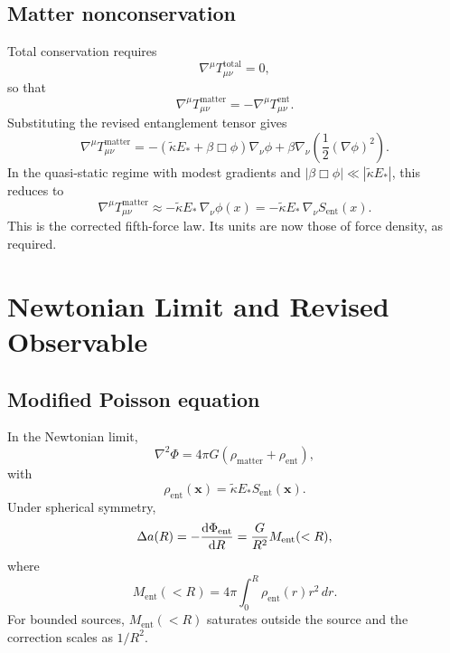 \documentclass[11pt]{article}
\begin{document}
\subsection{Matter nonconservation}

Total conservation requires
\begin{equation}
\nabla^\mu T^{\mathrm{total}}_{\mu\nu} = 0,
\end{equation}
so that
\begin{equation}
\nabla^\mu T^{\mathrm{matter}}_{\mu\nu} = -\nabla^\mu T^{\mathrm{ent}}_{\mu\nu}.
\end{equation}
Substituting the revised entanglement tensor gives
\begin{equation}
\nabla^\mu T^{\mathrm{matter}}_{\mu\nu} = -\left(\tilde{\kappa} E_* + \beta\Box\phi\right)\nabla_\nu\phi + \beta\nabla_\nu\left(\frac{1}{2}(\nabla\phi)^2\right).
\end{equation}
In the quasi-static regime with modest gradients and $|\beta\Box\phi| \ll |\tilde{\kappa}E_*|$, this reduces to
\begin{equation}
\nabla^\mu T^{\mathrm{matter}}_{\mu\nu} \approx -\tilde{\kappa}E_*\,\nabla_\nu\phi(x) = -\tilde{\kappa}E_*\,\nabla_\nu S_{\mathrm{ent}}(x).
\end{equation}
This is the corrected fifth-force law. Its units are now those of force density, as required.

\section{Newtonian Limit and Revised Observable}

\subsection{Modified Poisson equation}

In the Newtonian limit,
\begin{equation}
\nabla^2 \Phi = 4\pi G\left(\rho_{\mathrm{matter}} + \rho_{\mathrm{ent}}\right),
\end{equation}
with
\begin{equation}
\rho_{\mathrm{ent}}(\mathbf{x}) = \tilde{\kappa} E_* S_{\mathrm{ent}}(\mathbf{x}).
\end{equation}
Under spherical symmetry,
\begin{equation}
\Delta a(R) = -\dv{\Phi_{\mathrm{ent}}}{R} = \frac{G}{R^2}M_{\mathrm{ent}}(<R),
\end{equation}
where
\begin{equation}
M_{\mathrm{ent}}(<R) = 4\pi\int_0^R \rho_{\mathrm{ent}}(r)r^2\,dr.
\end{equation}
For bounded sources, $M_{\mathrm{ent}}(<R)$ saturates outside the source and the correction scales as $1/R^2$.
\end{document}
